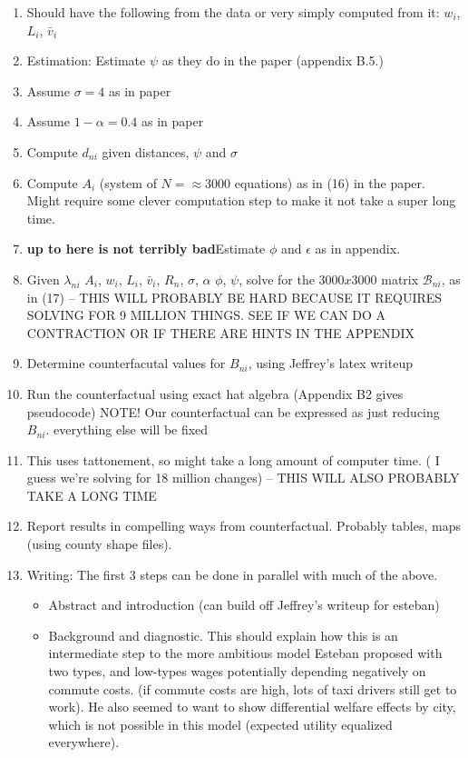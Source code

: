 \documentclass{article}
\begin{document}
\begin{enumerate}
    \item Should have the following from the data or very simply computed from it: $w_i$, $L_i$, $\bar v_i$
    \item Estimation: Estimate $\psi$ as they do in the paper (appendix B.5.)
    \item Assume $\sigma = 4$ as in paper
    \item Assume $1-\alpha = 0.4$ as in paper
    \item Compute $d_{ni}$ given distances, $\psi$ and $\sigma$
    \item Compute $A_i$ (system of $N = \approx 3000$ equations) as in (16) in the paper. Might require some clever computation step to make it not take a super long time.
    \item \textbf{up to here is not terribly bad}Estimate $\phi$ and $\epsilon$ as in appendix. 
    \item Given $\lambda_{ni}$ $A_i$, $w_i$, $L_i$, $\bar v_i$, $R_n$, $\sigma$, $\alpha$ $\phi$, $\psi$, solve for the $3000x3000$ matrix $\mathcal{B}_{ni}$, as in (17) -- THIS WILL PROBABLY BE HARD BECAUSE IT REQUIRES SOLVING FOR 9 MILLION THINGS. SEE IF WE CAN DO A CONTRACTION OR IF THERE ARE HINTS IN THE APPENDIX
    \item Determine counterfacutal values for $B_{ni}$, using Jeffrey's latex writeup
    \item Run the counterfactual using exact hat algebra (Appendix B2 gives pseudocode)  NOTE! Our counterfactual can be expressed as just reducing $B_{ni}$. everything else will be fixed
    \item This uses tattonement, so might take a long amount of computer time. ( I guess we're solving for 18 million changes) -- THIS WILL ALSO PROBABLY TAKE A LONG TIME
    \item  Report results in compelling ways from counterfactual. Probably tables, maps (using county shape files). 
    \item Writing: The first 3 steps can be done in parallel with much of the above.
    \begin{itemize}
        \item Abstract and introduction (can build off Jeffrey's writeup for esteban)
        \item Background and diagnostic. This should explain how this is an intermediate step to the more ambitious model Esteban proposed with two types, and low-types wages potentially depending negatively on commute costs.  (if commute costs are high, lots of taxi drivers still get to work). He also seemed to want to show differential welfare effects by city, which is not possible in this model (expected utility equalized everywhere).

\end{itemize}
\end{enumerate}
\end{document}
